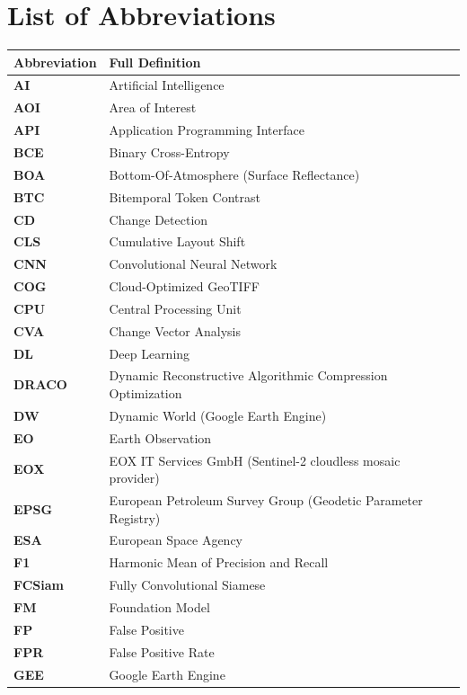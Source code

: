 \chapter*{List of Abbreviations}

\begin{longtable}{ll}
\toprule
\textbf{Abbreviation} & \textbf{Full Definition} \\
\midrule
\endhead
\bottomrule
\endfoot
\textbf{AI} & Artificial Intelligence \\
\textbf{AOI} & Area of Interest \\
\textbf{API} & Application Programming Interface \\
\textbf{BCE} & Binary Cross-Entropy \\
\textbf{BOA} & Bottom-Of-Atmosphere (Surface Reflectance) \\
\textbf{BTC} & Bitemporal Token Contrast \\
\textbf{CD} & Change Detection \\
\textbf{CLS} & Cumulative Layout Shift \\
\textbf{CNN} & Convolutional Neural Network \\
\textbf{COG} & Cloud-Optimized GeoTIFF \\
\textbf{CPU} & Central Processing Unit \\
\textbf{CVA} & Change Vector Analysis \\
\textbf{DL} & Deep Learning \\
\textbf{DRACO} & Dynamic Reconstructive Algorithmic Compression Optimization \\
\textbf{DW} & Dynamic World (Google Earth Engine) \\
\textbf{EO} & Earth Observation \\
\textbf{EOX} & EOX IT Services GmbH (Sentinel-2 cloudless mosaic provider) \\
\textbf{EPSG} & European Petroleum Survey Group (Geodetic Parameter Registry) \\
\textbf{ESA} & European Space Agency \\
\textbf{F1} & Harmonic Mean of Precision and Recall \\
\textbf{FCSiam} & Fully Convolutional Siamese \\
\textbf{FM} & Foundation Model \\
\textbf{FP} & False Positive \\
\textbf{FPR} & False Positive Rate \\
\textbf{GEE} & Google Earth Engine \\

\end{longtable}
